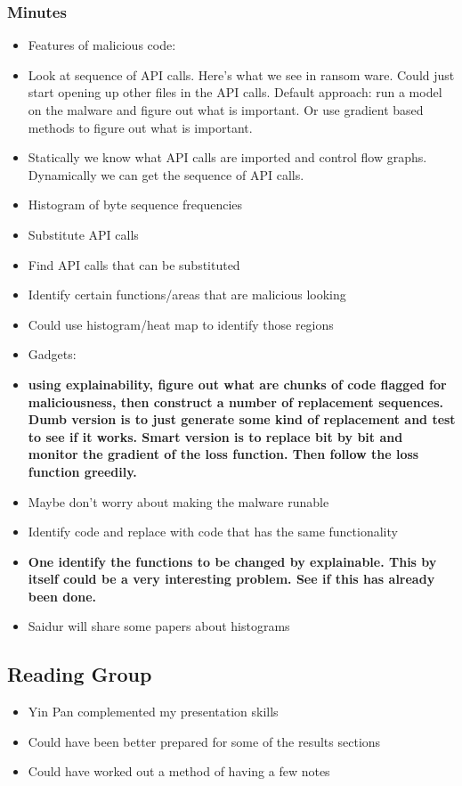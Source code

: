 \documentclass{article}
\begin{document}
\subsubsection*{Minutes}
\begin{itemize}
	\item Features of malicious code: 
	\item Look at sequence of API calls. Here's what we see in ransom ware. Could just start opening up other files in the API calls. Default approach:  run a model on the malware and figure out what is important. Or use gradient based methods to figure out what is important. 
	\item Statically we know what API calls are imported and control flow graphs. Dynamically we can get the sequence of API calls. 
	\item Histogram of byte sequence frequencies
	\item Substitute API calls
	\item Find API calls that can be substituted
	\item Identify certain functions/areas that are malicious looking
	\item Could use histogram/heat map to identify those regions
	\item Gadgets: 
	\item \textbf{using explainability, figure out what are chunks of code flagged for maliciousness, then construct a number of replacement sequences. Dumb version is to just generate some kind of replacement and test to see if it works. Smart version is to replace bit by bit and monitor the gradient of the loss function. Then follow the loss function greedily. }
	\item Maybe don't worry about making the malware runable
	\item Identify code and replace with code that has the same functionality
	\item \textbf{One identify the functions to be changed by explainable. This by itself could be a very interesting problem. See if this has already been done. } 
	\item Saidur will share some papers about histograms
\end{itemize}

\subsection*{Reading Group}
\begin{itemize}
	\item Yin Pan complemented my presentation skills
	\item Could have been better prepared for some of the results sections
	\item Could have worked out a method of having a few notes
\end{itemize}
\end{document}
